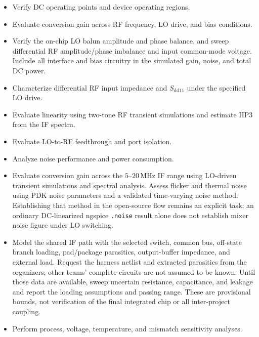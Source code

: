 \begin{itemize}
    \item Verify DC operating points and device operating regions.

    \item Evaluate conversion gain across RF frequency, LO drive, and bias conditions.

    \item Verify the on-chip LO balun amplitude and phase balance, and sweep differential RF amplitude/phase imbalance and input common-mode voltage.
    Include all interface and bias circuitry in the simulated gain, noise, and total DC power.

    \item Characterize differential RF input impedance and \(S_{\mathrm{dd}11}\) under the specified LO drive.

    \item Evaluate linearity using two-tone RF transient simulations and estimate IIP3 from the IF spectra.

    \item Evaluate LO-to-RF feedthrough and port isolation.

    \item Analyze noise performance and power consumption.

    \item Evaluate conversion gain across the \(5\)--\(20\,\mathrm{MHz}\) IF range using LO-driven transient simulations and spectral analysis.
    Assess flicker and thermal noise using PDK noise parameters and a validated time-varying noise method.
    Establishing that method in the open-source flow remains an explicit task; an ordinary DC-linearized ngspice \texttt{.noise} result alone does not establish mixer noise figure under LO switching.

    \item Model the shared IF path with the selected switch, common bus, off-state branch loading, pad/package parasitics, output-buffer impedance, and external load.
    Request the harness netlist and extracted parasitics from the organizers; other teams' complete circuits are not assumed to be known.
    Until those data are available, sweep uncertain resistance, capacitance, and leakage and report the loading assumptions and passing range.
    These are provisional bounds, not verification of the final integrated chip or all inter-project coupling.

    \item Perform process, voltage, temperature, and mismatch sensitivity analyses.
\end{itemize}


